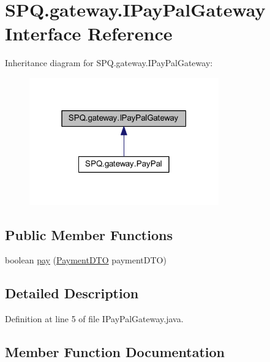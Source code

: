 \hypertarget{interface_s_p_q_1_1gateway_1_1_i_pay_pal_gateway}{}\section{S\+P\+Q.\+gateway.\+I\+Pay\+Pal\+Gateway Interface Reference}
\label{interface_s_p_q_1_1gateway_1_1_i_pay_pal_gateway}


Inheritance diagram for S\+P\+Q.\+gateway.\+I\+Pay\+Pal\+Gateway\+:
\nopagebreak
\begin{figure}[H]
\begin{center}
\leavevmode
\includegraphics[width=232pt]{interface_s_p_q_1_1gateway_1_1_i_pay_pal_gateway__inherit__graph}
\end{center}
\end{figure}
\subsection*{Public Member Functions}
\begin{DoxyCompactItemize}
\item 
boolean \mbox{\hyperlink{interface_s_p_q_1_1gateway_1_1_i_pay_pal_gateway_a064ef641b0db9c4a6d0de59089a108bf}{pay}} (\mbox{\hyperlink{class_s_p_q_1_1dto_1_1_payment_d_t_o}{Payment\+D\+TO}} payment\+D\+TO)
\end{DoxyCompactItemize}


\subsection{Detailed Description}


Definition at line 5 of file I\+Pay\+Pal\+Gateway.\+java.



\subsection{Member Function Documentation}
\mbox{\label{interface_s_p_q_1_1gateway_1_1_i_pay_pal_gateway_a064ef641b0db9c4a6d0de59089a108bf}} 
